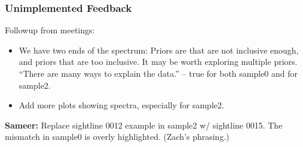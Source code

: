 \documentclass[fleqn,usenatbib]{mnras}
\begin{document}
\subsubsection{Unimplemented Feedback}

Followup from meetings:
\begin{itemize}
    \item We have two ends of the spectrum:
Priors are that are not inclusive enough, and priors that are too inclusive.
It may be worth exploring multiple priors.
``There are many ways to explain the data.'' -- true for both sample0 and for sample2.
    \item Add more plots showing spectra, especially for sample2.
\end{itemize}

\textbf{Sameer:}
Replace sightline 0012 example in sample2 w/ sightline 0015.
The mismatch in sample0 is overly highlighted. (Zach's phrasing.)
\end{document}
